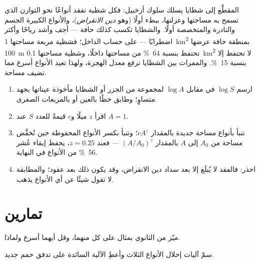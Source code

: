\begin{proposition}[التجزؤ]\label{prop:b1:ecosystem-dynamics:fragmentation}
 المقطَّع إلى شظايا يسلك سلوك أرخبيل: فكل
شظية تفقد أنواعًا نحو التوازن الذي تسمح به مساحتها وعزلتها،
ببطء أولًا (وهو \emph{دين الانقراض})، والأنواع الكبيرة الجسم
والنادرة والمتخصصة أولًا. والشظايا تكسب كذلك حافة --- أجف
وأشد رياحًا وأكثر اضطرابًا --- على حساب الداخل؛ فشظية مربعة
مساحتها \qty{1}{km^2} بمنطقة حافة عرضها \qty{100}{m} تحتفظ
بنسبة \qty{64}{\%} من مساحتها داخلًا، وشظية مساحتها \qty{0.1}{km^2} لا تحتفظ
إلا بنسبة \qty{15}{\%}. والممرات بين الشظايا ترفع معدل الهجرة،
ولهذا تعيد الأنواع أسرع مما تضيف مساحة.
\end{proposition}

\begin{method}\label{met:b1:ecosystem-dynamics:sar}
\begin{enumerate}
  \item ارسم $\log S$ في مقابل $\log A$ لمجموعة من الجزر أو
        الشظايا مأخوذة عيناتها بجهد متساوٍ؛ وطابق خطًا بالعين أو
        بالمربعات الصغرى.
  \item اقرأ $z$ ميلًا و$c$ قيمةً للعدد $S$ عند $A = 1$.
  \item تنبأ بأنواع مساحة جديدة بالمقدار $cA^z$؛ وتنبأ
        بكسر الأنواع المحفوظة حين تُخفَّض مساحة من
        $A_0$ إلى $A$ بالمقدار $(A/A_0)^z$ --- فعند $z = 0.25$، يحفظ إبقاء عُشر
         \qty{56}{\%} من الأنواع في النهاية.
  \item احذر: فالفقد لا يُبلَغ إلا بعد سداد دين
        الانقراض، وقد يكون ذلك بعد عقود؛ والمطابقة لا تقول شيئًا عن
        أي الأنواع يذهب.
\end{enumerate}
\end{method}

\section{تمارين}

\begin{exercise}[$\star$]\label{exo:b1:ecosystem-dynamics:1}
ميّز  من الثانوي بمثال على
كل منهما، وقل أيهما أسرع ولماذا.
\end{exercise}

\begin{exercise}[$\star$]\label{exo:b1:ecosystem-dynamics:2}
سمّ آليات إحلال الأنواع الثلاث وأعطِ الآلية
السائدة على تدفق حمم جديد.
\end{exercise}


